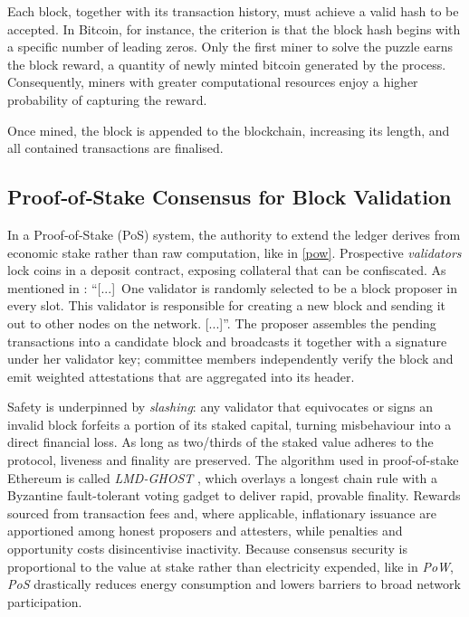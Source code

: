 Each block, together with its transaction history, must achieve a valid hash to be accepted. In Bitcoin, for instance, the criterion is that the block hash begins with a specific number of leading zeros. Only the first miner to solve the puzzle earns the block reward, a quantity of newly minted bitcoin generated by the process. Consequently, miners with greater computational resources enjoy a higher probability of capturing the reward.

Once mined, the block is appended to the blockchain, increasing its length, and all contained transactions are finalised.

\subsection{Proof‑of‑Stake Consensus for Block Validation}\label{pos}
In a Proof‑of‑Stake (PoS) system, the authority to extend the ledger derives from economic stake rather than raw computation, like in \ref{pow}. Prospective \textit{validators} lock coins in a deposit contract, exposing collateral that can be confiscated. As mentioned in \cite{validators}: “[...]~One validator is randomly selected to be a block proposer in every slot. This validator is responsible for creating a new block and sending it out to other nodes on the network. [...]”. The proposer assembles the pending transactions into a candidate block and broadcasts it together with a signature under her validator key; committee members independently verify the block and emit weighted attestations that are aggregated into its header.

Safety is underpinned by \textit{slashing}: any validator that equivocates or signs an invalid block forfeits a portion of its staked capital, turning misbehaviour into a direct financial loss. As long as two/thirds of the staked value adheres to the protocol, liveness and finality are preserved. The algorithm used in proof-of-stake Ethereum is called \textit{LMD-GHOST} \cite{buterin2020combiningghostcasper}, which overlays a longest chain rule with a Byzantine fault-tolerant voting gadget to deliver rapid, provable finality. Rewards sourced from transaction fees and, where applicable, inflationary issuance are apportioned among honest proposers and attesters, while penalties and opportunity costs disincentivise inactivity. Because consensus security is proportional to the value at stake rather than electricity expended, like in \textit{PoW}, \textit{PoS} drastically reduces energy consumption and lowers barriers to broad network participation.

